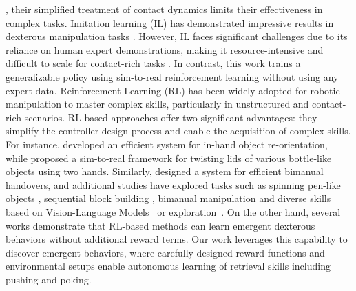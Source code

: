 \documentclass[10pt, a4paper, logo, twocolumn, copyright]{psibot} %
\begin{document}
, their simplified treatment of contact dynamics limits their effectiveness in complex tasks. Imitation learning (IL) has demonstrated impressive results in dexterous manipulation tasks \cite{9561802, pmlr-v205-chen23b}. However, IL faces significant challenges due to its reliance on human expert demonstrations, making it resource-intensive and difficult to scale for contact-rich tasks \cite{chen2024objectcentric, yang2024anyrotate, lin2024twisting}. In contrast, this work trains a generalizable policy using sim-to-real reinforcement learning without using any expert data. Reinforcement Learning (RL) has been widely adopted for robotic manipulation to master complex skills, particularly in unstructured and contact-rich scenarios. RL-based approaches offer two significant advantages: they simplify the controller design process and enable the acquisition of complex skills. For instance, \citet{pmlr-v164-chen22a} developed an efficient system for in-hand object re-orientation, while \citet{lin2024twisting} proposed a sim-to-real framework for twisting lids of various bottle-like objects using two hands. Similarly, \citet{pmlr-v229-huang23d} designed a system for efficient bimanual handovers, and additional studies have explored tasks such as spinning pen-like objects \cite{wang2024lessons}, sequential block building \cite{pmlr-v229-chen23e}, bimanual manipulation \cite{10343126, lin2024twisting} and diverse skills based on Vision-Language Models~\cite{liu2025vlp, sun2024large} or exploration~\cite{Bai_Zhang_Tao_Wu_Wang_Xu_2023, zhang2025beta}. On the other hand, several works \cite{zhou2022learning, pmlr-v229-agarwal23a, yang2024anyrotate, lin2024twisting} demonstrate that RL-based methods can learn emergent dexterous behaviors without additional reward terms. Our work leverages this capability to discover emergent behaviors, where carefully designed reward functions and environmental setups enable autonomous learning of retrieval skills including pushing and poking.
\end{document}
